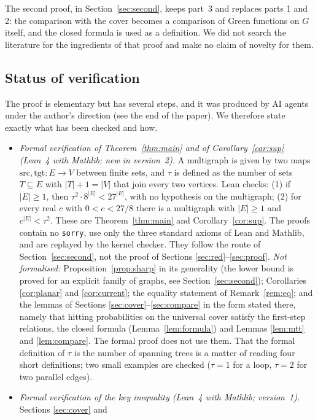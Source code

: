 \documentclass[11pt]{amsart}
\theoremstyle{plain}
\theoremstyle{remark}
\newcommand{\code}[1]{\texttt{#1}}
\begin{document}
The second proof, in Section~\ref{sec:second}, keeps part~3 and replaces parts 1 and 2: the comparison with the
cover becomes a comparison of Green functions on $G$ itself, and the closed formula is used as a definition.
We did not search the literature for the ingredients of that proof and make no claim of novelty for them.

\subsection*{Status of verification}
The proof is elementary but has several steps, and it was produced by AI agents under the author's direction (see
the end of the paper). We therefore state exactly what has been checked and how.
\begin{itemize}
\item \emph{Formal verification of Theorem~\ref{thm:main} and of Corollary~\ref{cor:sup} (Lean~4 with Mathlib; new
  in version~2).} A multigraph is given by two maps $\mathrm{src},\mathrm{tgt}\colon E\to V$ between finite sets,
  and $\tau$ is defined as the number of sets $T\subseteq E$ with $|T|+1=|V|$ that join every two vertices. Lean
  checks: (1) if $|E|\ge1$, then $\tau^2\cdot8^{|E|}<27^{|E|}$, with no hypothesis on the multigraph; (2) for every
  real $c$ with $0<c<27/8$ there is a multigraph with $|E|\ge1$ and $c^{|E|}<\tau^2$. These are
  Theorem~\ref{thm:main} and Corollary~\ref{cor:sup}. The proofs contain no \code{sorry}, use only the three
  standard axioms of Lean and Mathlib, and are replayed by the kernel checker. They follow the route of
  Section~\ref{sec:second}, not the proof of Sections \ref{sec:red}--\ref{sec:proof}.
  \emph{Not formalised:} Proposition~\ref{prop:sharp} in its generality (the lower bound is proved for an explicit
  family of graphs, see Section~\ref{sec:second}); Corollaries \ref{cor:planar} and \ref{cor:current}; the equality
  statement of Remark~\ref{rem:eq}; and the lemmas of Sections \ref{sec:cover}--\ref{sec:compare} in the form
  stated there, namely that hitting probabilities on the universal cover satisfy the first-step relations, the
  closed formula (Lemma~\ref{lem:formula}) and Lemmas \ref{lem:mtt} and \ref{lem:compare}. The formal proof does
  not use them. That the formal definition of $\tau$ is the number of spanning trees is a matter of reading four
  short definitions; two small examples are checked ($\tau=1$ for a loop, $\tau=2$ for two parallel edges).
\item \emph{Formal verification of the key inequality (Lean~4 with Mathlib; version~1).} Sections \ref{sec:cover} and

\end{itemize}
\end{document}
